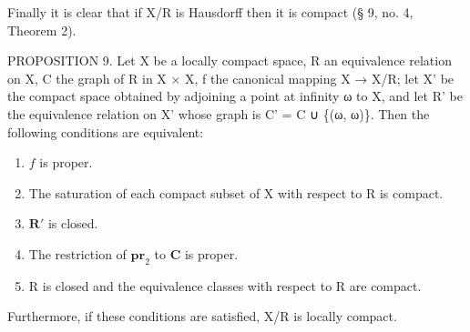 Finally it is clear that if X/R is Hausdorff then it is compact (§ 9, no. 4, Theorem 2).

PROPOSITION 9. Let X be a locally compact space, R an equivalence relation on X, C the graph of R in X × X, f the canonical mapping X → X/R; let X' be the compact space obtained by adjoining a point at infinity ω to X, and let R' be the equivalence relation on X' whose graph is C' = C ∪ \{(ω, ω)\}. Then the following conditions are equivalent:

\begin{enumerate}
\def\labelenumi{\alph{enumi})}
\item
  \(f\) is proper.
\item
  The saturation of each compact subset of X with respect to R is compact.
\item
  \(\mathbf{R}'\) is closed.
\item
  The restriction of \(\mathbf{pr}_2\) to \(\mathbf{C}\) is proper.
\item
  R is closed and the equivalence classes with respect to R are compact.
\end{enumerate}

Furthermore, if these conditions are satisfied, X/R is locally compact.

